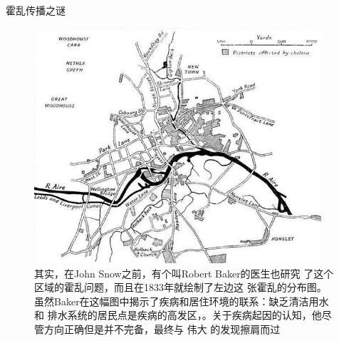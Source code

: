 \documentclass{beamerthemeMono}
\begin{document}
\begin{frame}{\subsecname}{霍乱传播之谜}

  \begin{figure}
    \begin{columns}
      \begin{column}{.6\textwidth}
        \includegraphics[width=\columnwidth]{Robert_Baker.jpg}
      \end{column}

      \begin{column}{.35\textwidth}
        \centering
        \caption{其实，在John Snow之前，有个叫Robert Baker的医生也研究
          了这个区域的霍乱问题，而且在1833年就绘制了左边这
          张霍乱的分布图。\\
          虽然Baker在这幅图中揭示了疾病和居住环境的联系：缺乏清洁用水和
          排水系统的居民点是疾病的高发区，。关于疾病起因的认知，他尽管方向正确但是并不完备，最终与
          伟大
          的发现擦肩而过\\
          }
      \end{column}
    \end{columns}
  \end{figure}

\end{frame}
\end{document}
